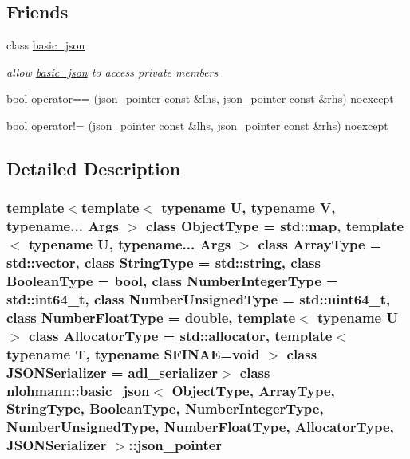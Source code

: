 \subsection*{Friends}
\begin{DoxyCompactItemize}
\item 
class \mbox{\hyperlink{classnlohmann_1_1basic__json_1_1json__pointer_ada3100cdb8700566051828f1355fa745}{basic\+\_\+json}}
\begin{DoxyCompactList}\small\item\em allow \mbox{\hyperlink{classnlohmann_1_1basic__json}{basic\+\_\+json}} to access private members \end{DoxyCompactList}\item 
bool \mbox{\hyperlink{classnlohmann_1_1basic__json_1_1json__pointer_a4667ef558c8c3f8a646bfda0c6654653}{operator==}} (\mbox{\hyperlink{classnlohmann_1_1basic__json_1_1json__pointer}{json\+\_\+pointer}} const \&lhs, \mbox{\hyperlink{classnlohmann_1_1basic__json_1_1json__pointer}{json\+\_\+pointer}} const \&rhs) noexcept
\item 
bool \mbox{\hyperlink{classnlohmann_1_1basic__json_1_1json__pointer_a6779edcf28e6f018a3bbb29c0b4b5e1e}{operator!=}} (\mbox{\hyperlink{classnlohmann_1_1basic__json_1_1json__pointer}{json\+\_\+pointer}} const \&lhs, \mbox{\hyperlink{classnlohmann_1_1basic__json_1_1json__pointer}{json\+\_\+pointer}} const \&rhs) noexcept
\end{DoxyCompactItemize}


\subsection{Detailed Description}
\subsubsection*{template$<$template$<$ typename U, typename V, typename... Args $>$ class Object\+Type = std\+::map, template$<$ typename U, typename... Args $>$ class Array\+Type = std\+::vector, class String\+Type = std\+::string, class Boolean\+Type = bool, class Number\+Integer\+Type = std\+::int64\+\_\+t, class Number\+Unsigned\+Type = std\+::uint64\+\_\+t, class Number\+Float\+Type = double, template$<$ typename U $>$ class Allocator\+Type = std\+::allocator, template$<$ typename T, typename S\+F\+I\+N\+A\+E=void $>$ class J\+S\+O\+N\+Serializer = adl\+\_\+serializer$>$\newline
class nlohmann\+::basic\+\_\+json$<$ Object\+Type, Array\+Type, String\+Type, Boolean\+Type, Number\+Integer\+Type, Number\+Unsigned\+Type, Number\+Float\+Type, Allocator\+Type, J\+S\+O\+N\+Serializer $>$\+::json\+\_\+pointer}

